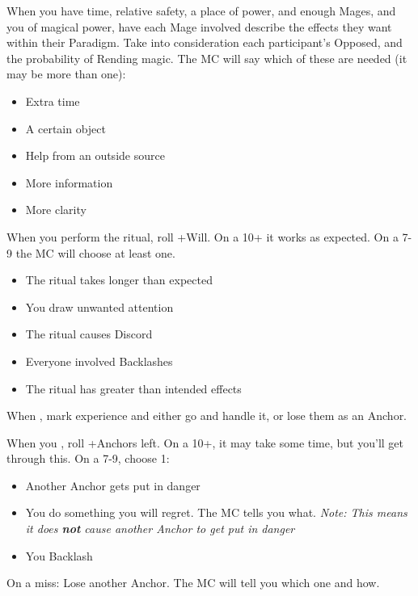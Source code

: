 \begin{multicols}{3}
\begin{move}
  \end{move}

  \columnbreak
  
  \begin{move}
    When you have time, relative safety, a place of power, and enough
    Mages, and you  of magical power, have
    each Mage involved describe the effects they want within their Paradigm.
    Take into consideration each participant's Opposed, and the
    probability of Rending magic. The MC will say which of these are
    needed (it may be more than one):
    \begin{itemize}
      \setlength\itemsep{0em}
    \item Extra time
    \item A certain object
    \item Help from an outside source
    \item More information
    \item More clarity
    \end{itemize}
    When you perform the ritual, roll +Will. On a 10+ it works as
    expected. On a 7-9 the MC will choose at least one.
    \begin{itemize}
      \setlength\itemsep{0em}
    \item The ritual takes longer than expected
    \item You draw unwanted attention
    \item The ritual causes Discord
    \item Everyone involved Backlashes
    \item The ritual has greater than intended effects
    \end{itemize}
  \end{move}

  \SEPARATOR

  \begin{move}
    When , mark
    experience and either go and handle it, or lose them as an
    Anchor.
  \end{move}

  \SEPARATOR

  \begin{move}
    When you , roll +Anchors left. On a 10+,
    it may take some time, but you'll get through this. On a 7-9,
    choose 1:
    \begin{itemize}
      \setlength\itemsep{0em}
    \item Another Anchor gets put in danger
    \item You do something you will regret. The MC tells you
      what. \textit{Note: This means it does \textbf{not} cause
        another Anchor to get put in danger}
      \item You Backlash
    \end{itemize}
    On a miss: Lose another Anchor. The MC will tell you which one and
    how.
  \end{move}


\end{multicols}
